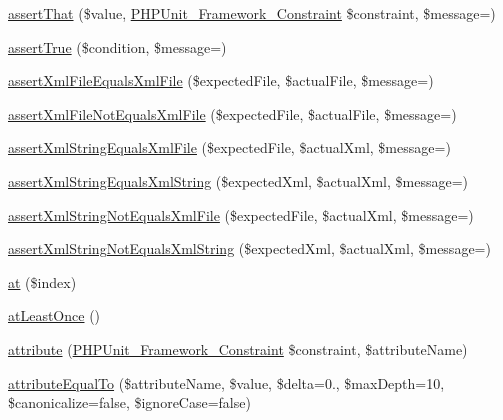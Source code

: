 \begin{DoxyCompactItemize}
\item 
\mbox{\hyperlink{_functions_8php_a542e33fac4bbdadeb83922922766ea01}{assert\+That}} (\$value, \mbox{\hyperlink{class_p_h_p_unit___framework___constraint}{P\+H\+P\+Unit\+\_\+\+Framework\+\_\+\+Constraint}} \$constraint, \$message=\textquotesingle{}\textquotesingle{})
\item 
\mbox{\hyperlink{_functions_8php_aa4c28a3a11e84b789029c7c816def43c}{assert\+True}} (\$condition, \$message=\textquotesingle{}\textquotesingle{})
\item 
\mbox{\hyperlink{_functions_8php_ac95f70d5d00b1a45197a6cc9c91df613}{assert\+Xml\+File\+Equals\+Xml\+File}} (\$expected\+File, \$actual\+File, \$message=\textquotesingle{}\textquotesingle{})
\item 
\mbox{\hyperlink{_functions_8php_ac5c1e95227dd7eaca8d580743cde7ce5}{assert\+Xml\+File\+Not\+Equals\+Xml\+File}} (\$expected\+File, \$actual\+File, \$message=\textquotesingle{}\textquotesingle{})
\item 
\mbox{\hyperlink{_functions_8php_a6a78b56b77971332459b376739d1ac1a}{assert\+Xml\+String\+Equals\+Xml\+File}} (\$expected\+File, \$actual\+Xml, \$message=\textquotesingle{}\textquotesingle{})
\item 
\mbox{\hyperlink{_functions_8php_a7a51344beb9ebf1977761f7be8a1e004}{assert\+Xml\+String\+Equals\+Xml\+String}} (\$expected\+Xml, \$actual\+Xml, \$message=\textquotesingle{}\textquotesingle{})
\item 
\mbox{\hyperlink{_functions_8php_ae3a82a71a4b6c8bb8c5b4f9229dc1aa4}{assert\+Xml\+String\+Not\+Equals\+Xml\+File}} (\$expected\+File, \$actual\+Xml, \$message=\textquotesingle{}\textquotesingle{})
\item 
\mbox{\hyperlink{_functions_8php_a8f9009cb494df84d4ef7b6655f95b460}{assert\+Xml\+String\+Not\+Equals\+Xml\+String}} (\$expected\+Xml, \$actual\+Xml, \$message=\textquotesingle{}\textquotesingle{})
\item 
\mbox{\hyperlink{_functions_8php_a1638aacf03530a73b0a3c373471ac79b}{at}} (\$index)
\item 
\mbox{\hyperlink{_functions_8php_aea3eb470f1ce76a0e4f968f8324d4321}{at\+Least\+Once}} ()
\item 
\mbox{\hyperlink{_functions_8php_ae0bf34a4330eb7f1f124d77cb66b2232}{attribute}} (\mbox{\hyperlink{class_p_h_p_unit___framework___constraint}{P\+H\+P\+Unit\+\_\+\+Framework\+\_\+\+Constraint}} \$constraint, \$attribute\+Name)
\item 
\mbox{\hyperlink{_functions_8php_a4b7f52ca98a739cce5bfd4346d3c9ad9}{attribute\+Equal\+To}} (\$attribute\+Name, \$value, \$delta=0., \$max\+Depth=10, \$canonicalize=false, \$ignore\+Case=false)

\end{DoxyCompactItemize}
